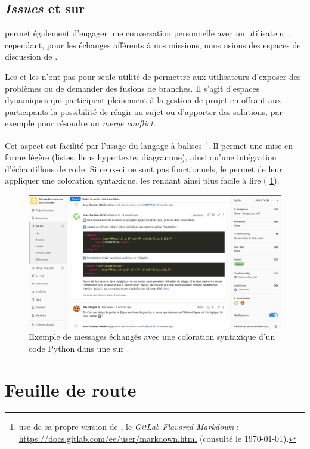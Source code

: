 \subsection{\textit{Issues} et \mergerequests{} sur \gitlab}

\Mattermost{} permet également d'engager une conversation personnelle avec un utilisateur ; cependant, pour les échanges afférents à nos missions, nous usions des espaces de discussion de \gitlab.

Les \issues{} et les \mergerequests{} n'ont pas pour seule utilité de permettre aux utilisateurs d'exposer des problèmes ou de demander des fusions de branches. Il s'agit d'espaces dynamiques qui participent pleinement à la gestion de projet en offrant aux participants la possibilité de réagir au sujet ou d'apporter des solutions, par exemple pour résoudre un \textit{merge conflict}.

Cet aspect est facilité par l'usage du langage à balises \markdown\footnote{\gitlab{} use de sa propre version de \markdown, le \textit{GitLab Flavored Markdown} : \url{https://docs.gitlab.com/ee/user/markdown.html} (consulté le \today).}. Il permet une mise en forme légère (listes, liens hypertexte, diagramme), ainsi qu'une intégration d'échantillons de code. Si ceux-ci ne sont pas fonctionnels, le \markdown{} permet de leur appliquer une coloration syntaxique, les rendant ainsi plus facile à lire (\fig{} \ref{fig:ex_gitlab}).

\begin{figure}
    \centering
    \includegraphics[width=16cm]{img/gitlab.png}
    \caption{Exemple de messages échangés avec une coloration syntaxique d'un code Python dans une \issue{} sur \gitlab.}
    \label{fig:ex_gitlab}
\end{figure}

\section{Feuille de route}

